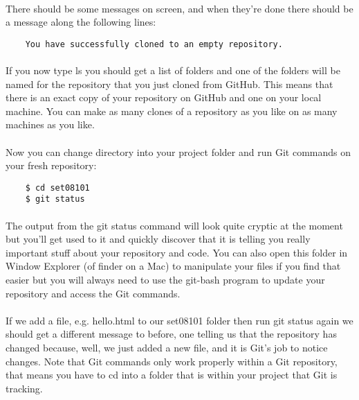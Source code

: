 \documentclass[10pt, a4paper]{article}
\begin{document}
\paragraph{} There should be some messages on screen, and when they're done there should be a message along the following lines:
\begin{lstlisting}
    You have successfully cloned to an empty repository.
\end{lstlisting}
\paragraph{} If you now type ls you should get a list of folders and one of the folders will be named for the repository that you just cloned from GitHub. This means that there is an exact copy of your repository on GitHub and one on your local machine. You can make as many clones of a repository as you like on as many machines as you like.

\paragraph{} Now you can change directory into your project folder and run Git commands on your fresh repository:

\begin{lstlisting}
    $ cd set08101
    $ git status
\end{lstlisting}

\paragraph{} The output from the git status command will look quite cryptic at the moment but you'll get used to it and quickly discover that it is telling you really important stuff about your repository and code. You can also open this folder in Window Explorer (of finder on a Mac) to manipulate your files if you find that easier but you will always need to use the git-bash program to update your repository and access the Git commands.

\paragraph{} If we add a file, e.g. hello.html to our set08101 folder then run git status again we should get a different message to before, one telling us that the repository has changed because, well, we just added a new file, and it is Git's job to notice changes. Note that Git commands only work properly within a Git repository, that means you have to cd into a folder that is within your project that Git is tracking.
\end{document}

